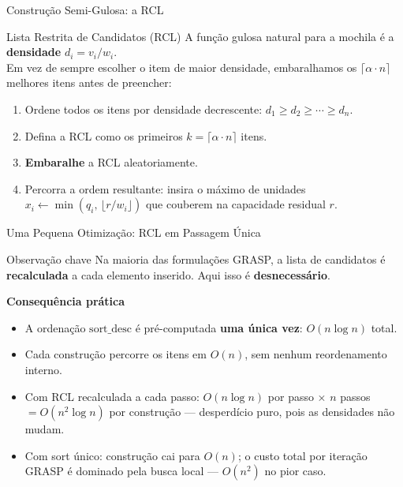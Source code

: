 \documentclass[aspectratio=169]{beamer}
\begin{document}
\begin{frame}{Construção Semi-Gulosa: a RCL}

  \begin{block}{Lista Restrita de Candidatos (RCL)}
    A função gulosa natural para a mochila é a \textbf{densidade}
    $d_i = v_i / w_i$.\\[0.3em]
    Em vez de sempre escolher o item de maior densidade, embaralhamos
    os $\lceil \alpha \cdot n \rceil$ melhores itens antes de preencher:
  \end{block}

  \vspace{0.3em}
  \begin{enumerate}
    \item Ordene todos os itens por densidade decrescente: \; $d_1 \geq d_2 \geq \cdots \geq d_n$.
    \item Defina a RCL como os primeiros $k = \lceil \alpha \cdot n \rceil$ itens.
    \item \textbf{Embaralhe} a RCL aleatoriamente.
    \item Percorra a ordem resultante: insira o máximo de unidades
          $x_i \leftarrow \min\!\left(q_i,\, \lfloor r / w_i \rfloor\right)$ que couberem na capacidade residual $r$.
  \end{enumerate}


\end{frame}

\begin{frame}{Uma Pequena Otimização: RCL em Passagem Única}

  \begin{alertblock}{Observação chave}
    Na maioria das formulações GRASP, a lista de candidatos é \textbf{recalculada}
    a cada elemento inserido. Aqui isso é \textbf{desnecessário}.
  \end{alertblock}

  \vspace{0.5em}
  \textbf{Consequência prática}

  \begin{itemize}
    \item A ordenação $\text{sort\_desc}$ é pré-computada \textbf{uma única vez}: $O(n \log n)$ total.
    \item Cada construção percorre os itens em $O(n)$, sem nenhum reordenamento interno.
    \item Com RCL recalculada a cada passo: $O(n \log n)$ por passo $\times$ $n$ passos
          $= O(n^2 \log n)$ por construção — desperdício puro, pois as densidades não mudam.
    \item Com sort único: construção cai para $O(n)$; o custo total por iteração GRASP
          é dominado pela busca local — $O(n^2)$ no pior caso.
  \end{itemize}

  \vspace{0.3em}

\end{frame}
\end{document}

